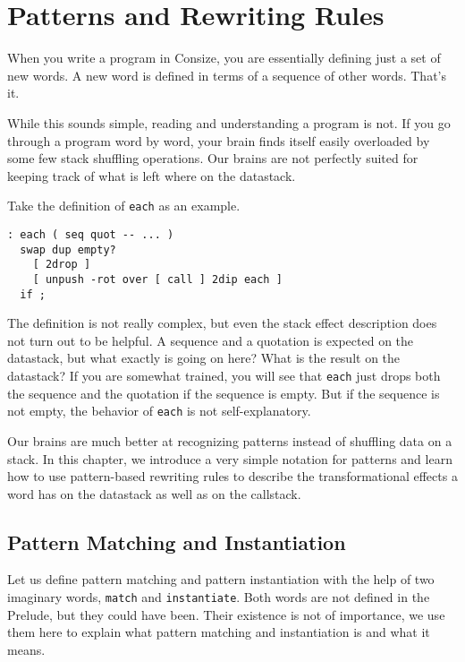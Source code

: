 \chapter{Patterns and Rewriting Rules}

When you write a program in Consize, you are essentially defining just a set of new words. A new word is defined in terms of a sequence of other words. That's it.

While this sounds simple, reading and understanding a program is not. If you go through a program word by word, your brain finds itself easily overloaded by some few stack shuffling operations. Our brains are not perfectly suited for keeping track of what is left where on the datastack.

Take the definition of \verb|each| as an example. 

\begin{verbatim}
: each ( seq quot -- ... )
  swap dup empty?
    [ 2drop ]
    [ unpush -rot over [ call ] 2dip each ]
  if ;
\end{verbatim}

The definition is not really complex, but even the stack effect description does not turn out to be helpful. A sequence and a quotation is expected on the datastack, but what exactly is going on here? What is the result on the datastack? If you are somewhat trained, you will see that \verb|each| just drops both the sequence and the quotation if the sequence is empty. But if the sequence is not empty, the behavior of \verb|each| is not self-explanatory.

Our brains are much better at recognizing patterns instead of shuffling data on a stack. In this chapter, we introduce a very simple notation for patterns and learn how to use pattern-based rewriting rules to describe the transformational effects a word has on the datastack as well as on the callstack.

\section{Pattern Matching and Instantiation}

Let us define pattern matching and pattern instantiation with the help of two imaginary words, \verb|match| and \verb|instantiate|. Both words are not defined in the Prelude, but they could have been. Their existence is not of importance, we use them here to explain what pattern matching and instantiation is and what it means.

